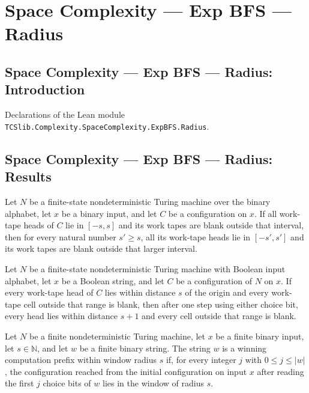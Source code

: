 \section{Space Complexity --- Exp BFS --- Radius}
\subsection*{Space Complexity --- Exp BFS --- Radius: Introduction}

Declarations of the Lean module \texttt{TCSlib.Complexity.SpaceComplexity.ExpBFS.Radius}.

\subsection*{Space Complexity --- Exp BFS --- Radius: Results}

\begin{lemma}
\label{Complexity.ExpBFS.inWin_mono}
\leanok
{}
Let $N$ be a finite-state nondeterministic Turing machine over the binary alphabet, let
$x$ be a binary input, and let $C$ be a configuration on $x$. If all work-tape heads of
$C$ lie in $[-s,s]$ and its work tapes are blank outside that interval, then for every
natural number $s'\ge s$, all its work-tape heads lie in $[-s',s']$ and its work tapes
are blank outside that larger interval.
\end{lemma}

\begin{lemma}
\label{Complexity.ExpBFS.inWin_stepWith}
\leanok
{}
Let $N$ be a finite-state nondeterministic Turing machine with Boolean input alphabet,
let $x$ be a Boolean string, and let $C$ be a configuration of $N$ on $x$. If every
work-tape head of $C$ lies within distance $s$ of the origin and every work-tape cell
outside that range is blank, then after one step using either choice bit, every head
lies within distance $s+1$ and every cell outside that range is blank.
\end{lemma}

\begin{definition}
\label{Complexity.ExpBFS.WinRun}
\leanok
{}
Let $N$ be a finite nondeterministic Turing machine, let $x$ be a finite binary input,
let $s\in\mathbb{N}$, and let $w$ be a finite binary string. The string $w$ is a winning
computation prefix within window radius $s$ if, for every integer $j$ with $0\le j\le
|w|$, the configuration reached from the initial configuration on input $x$ after
reading the first $j$ choice bits of $w$ lies in the window of radius $s$.
\end{definition}

